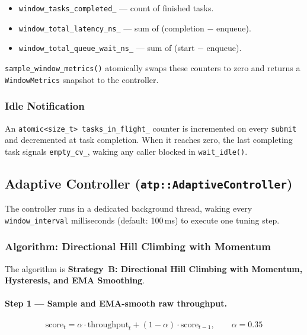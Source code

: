 \documentclass[12pt,a4paper]{article}
\begin{document}
\begin{itemize}
  \item \texttt{window\_tasks\_completed\_} --- count of finished tasks.
  \item \texttt{window\_total\_latency\_ns\_} --- sum of
        (completion $-$ enqueue).
  \item \texttt{window\_total\_queue\_wait\_ns\_} --- sum of
        (start $-$ enqueue).
\end{itemize}

\texttt{sample\_window\_metrics()} atomically swaps these counters to zero
and returns a \texttt{WindowMetrics} snapshot to the controller.

\subsubsection{Idle Notification}

An \texttt{atomic<size\_t> tasks\_in\_flight\_} counter is incremented on
every \texttt{submit} and decremented at task completion.
When it reaches zero, the last completing task signals \texttt{empty\_cv\_},
waking any caller blocked in \texttt{wait\_idle()}.

\subsection{Adaptive Controller (\texttt{atp::AdaptiveController})}

The controller runs in a dedicated background thread, waking every
\texttt{window\_interval} milliseconds (default: 100\,ms) to execute one
tuning step.

\subsubsection{Algorithm: Directional Hill Climbing with Momentum}

The algorithm is \textbf{Strategy~B: Directional Hill Climbing with
Momentum, Hysteresis, and EMA Smoothing}.

\paragraph{Step 1 --- Sample and EMA-smooth raw throughput.}

\begin{equation}
  \text{score}_t = \alpha \cdot \text{throughput}_t
    + (1 - \alpha) \cdot \text{score}_{t-1},
  \qquad \alpha = 0.35
  \label{eq:ema}
\end{equation}
\end{document}
